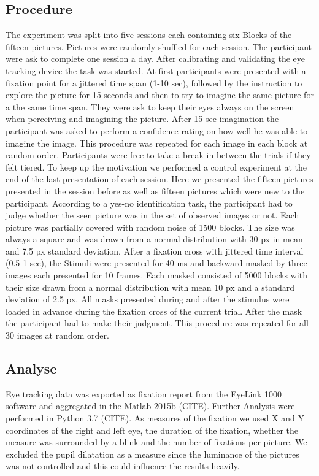 \documentclass[a4paper,man,natbib,floatsintext]{apa6}
\begin{document}

\subsection{Procedure} The experiment was split into five sessions each containing six Blocks of the fifteen pictures. Pictures were randomly shuffled for each session. 
The participant were ask to complete one session a day. After calibrating and  validating the eye tracking device the task was started.
At first participants were presented with a fixation point for a jittered time span (1-10 sec), followed by the instruction to explore the picture for 15 seconds and then to try to imagine the same picture for a the same time span. They were ask to keep their eyes always on the screen when perceiving and imagining the picture. After 15 sec imagination the participant was asked to perform a confidence rating on how well he was able to imagine the image. This procedure was repeated for each image in each block at random order. Participants were free to take a break in between the trials if they felt tiered. 
To keep up the motivation we performed a control experiment at the end of the last presentation of each session. Here we presented the fifteen pictures presented in the session before as well as fifteen pictures which were new to the participant. According to a yes-no identification task, the participant had to judge whether the seen picture was in the set of observed images or not. Each picture was partially covered with random noise of 1500 blocks. The size was always a square and  was drawn from a normal distribution with 30 px in mean and 7.5 px standard deviation. After a fixation cross with jittered time interval (0.5-1 sec), the Stimuli were presented for 40 ms and backward masked by three images each presented for 10 frames. Each masked consisted of 5000 blocks with their size drawn from a normal distribution with mean 10 px and a standard deviation of 2.5 px. All masks presented during and after the stimulus were loaded in advance during the fixation cross of the current trial. After the mask the participant had to make their judgment. This procedure was repeated for all 30 images at random order. \\

\subsection{Analyse} Eye tracking data was exported as fixation report from the EyeLink 1000 software and aggregated in the Matlab 2015b (CITE). Further Analysis were performed  in Python 3.7 (CITE). %
As measures of the fixation we used X and Y coordinates of the right and left eye, the duration of the fixation, whether the measure was surrounded by a blink and the number of fixations per picture. We excluded the pupil dilatation as a measure since the luminance of the pictures was not controlled and this could influence the results heavily.\\
\end{document}
